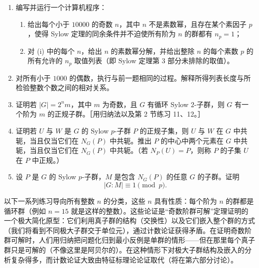 \begin{enumerate}[label=\arabic*.]
  \item 编写并运行一个计算机程序：
  \begin{enumerate}[label=(\roman*)]
    \item 给出每个小于 $10000$ 的奇数 $n$，其中 $n$ 不是素数幂，且存在某个素因子 $p$，使得 Sylow 定理的同余条件并不迫使所有阶为 $n$ 的群都有 $n_p=1$；
    \item 对 (i) 中的每个 $n$，给出 $n$ 的素数幂分解，并给出整除 $n$ 的每个素数 $p$ 的所有允许的 $n_p$ 取值列表（即 Sylow 定理第 3 部分未排除的取值）。
  \end{enumerate}
  \item 对所有小于 $1000$ 的偶数，执行与前一题相同的过程。解释所得列表长度与所检验整数个数之间的相对关系。
  \item 证明若 $|G|=2^nm$，其中 $m$ 为奇数，且 $G$ 有循环 Sylow $2$-子群，则 $G$ 有一个阶为 $m$ 的正规子群。［用归纳法以及第 2 节练习 11、12。］
  \item 证明若 $U$ 与 $W$ 是 $G$ 的 Sylow $p$-子群 $P$ 的正规子集，则 $U$ 与 $W$ 在 $G$ 中共轭，当且仅当它们在 $N_G(P)$ 中共轭。推出 $P$ 的中心中两个元素在 $G$ 中共轭，当且仅当它们在 $N_G(P)$ 中共轭。（若 $N_P(U)=P$，则称 $P$ 的子集 $U$ 在 $P$ 中正规。）
  \item 设 $P$ 是 $G$ 的 Sylow $p$-子群，$M$ 是包含 $N_G(P)$ 的任意 $G$ 的子群。证明
  \[
    |G:M|\equiv1\pmod p.
  \]
\end{enumerate}

以下一系列练习导向所有整数 $n$ 的分类，这些 $n$ 具有性质：每个阶为 $n$ 的群都是循环群（例如 $n=15$ 就是这样的整数）。这些论证是“奇数阶群可解”定理证明的一个极大简化原型：它们利用真子群的结构（交换性）以及它们嵌入整个群的方式（我们将看到不同极大子群交于单位元），通过计数论证获得矛盾。在证明奇数阶群可解时，人们用归纳把问题化归到最小反例是单群的情形——但在那里每个真子群只是可解的（不像这里是阿贝尔的）。在这种情形下对极大子群结构及嵌入的分析复杂得多，而计数论证大致由特征标理论论证取代（将在第六部分讨论）。

